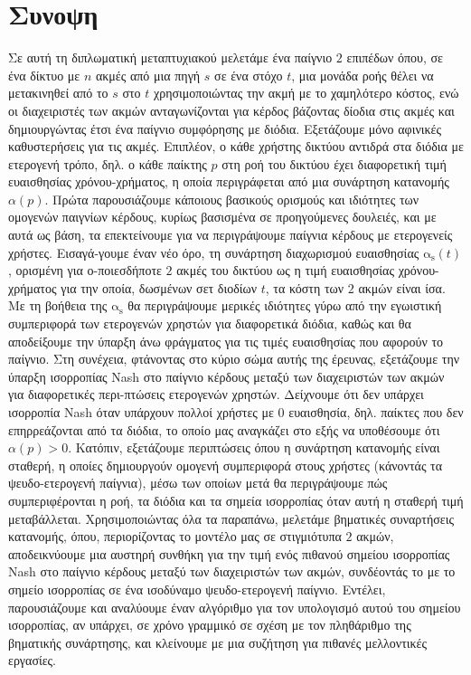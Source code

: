 \documentclass[10pt,a4paper]{book}
\newcommand{\as}{\mathrm{\alpha_s}}
\theoremstyle{definition}
\theoremstyle{comment}
\begin{document}
\thispagestyle{empty}
\null
\clearpage

\thispagestyle{empty}

\chapter*{Συνοψη}
Σε αυτή τη διπλωματική μεταπτυχιακού μελετάμε ένα παίγνιο $2$ επιπέδων όπου, σε ένα δίκτυο με $n$ ακμές από μια πηγή $s$ σε ένα στόχο $t$, μια μονάδα ροής θέλει να μετακινηθεί από το $s$ στο $t$ χρησιμοποιώντας την ακμή με το χαμηλότερο κόστος, ενώ οι διαχειριστές των ακμών ανταγωνίζονται για κέρδος βάζοντας δίοδια στις ακμές και δημιουργώντας έτσι ένα παίγνιο συμφόρησης με διόδια.
Εξετάζουμε μόνο αφινικές καθυστερήσεις για τις ακμές.
Επιπλέον, ο κάθε χρήστης δικτύου αντιδρά στα διόδια με ετερογενή τρόπο, δηλ. ο κάθε παίκτης $p$ στη ροή του δικτύου έχει διαφορετική τιμή ευαισθησίας χρόνου-χρήματος, η οποία περιγράφεται από μια συνάρτηση κατανομής $\alpha(p)$.
Πρώτα παρουσιάζουμε κάποιους βασικούς ορισμούς και ιδιότητες των ομογενών παιγνίων κέρδους, κυρίως βασισμένα σε προηγούμενες δουλειές, και με αυτά ως βάση, τα επεκτείνουμε για να περιγράψουμε παίγνια κέρδους με ετερογενείς χρήστες.
Εισαγά-γουμε έναν νέο όρο, τη συνάρτηση διαχωρισμού ευαισθησίας $\as(t)$, ορισμένη για ο-ποιεσδήποτε $2$ ακμές του δικτύου ως η τιμή ευαισθησίας χρόνου-χρήματος για την οποία, δωσμένων σετ διοδίων $t$, τα κόστη των $2$ ακμών είναι ίσα.
Με τη βοήθεια της $\as$ θα περιγράψουμε μερικές ιδιότητες γύρω από την εγωιστική συμπεριφορά των ετερογενών χρηστών για διαφορετικά διόδια, καθώς και θα αποδείξουμε την ύπαρξη άνω φράγματος για τις τιμές ευαισθησίας που αφορούν το παίγνιο.
Στη συνέχεια, φτάνοντας στο κύριο σώμα αυτής της έρευνας, εξετάζουμε την ύπαρξη ισορροπίας Nash στο παίγνιο κέρδους μεταξύ των διαχειριστών των ακμών για διαφορετικές περι-πτώσεις ετερογενών χρηστών.
Δείχνουμε ότι δεν υπάρχει ισορροπία Nash όταν υπάρχουν πολλοί χρήστες με $0$ ευαισθησία, δηλ. παίκτες που δεν επηρρεάζονται από τα διόδια, το οποίο μας αναγκάζει στο εξής να υποθέσουμε ότι $\alpha(p) > 0$.
Κατόπιν, εξετάζουμε περιπτώσεις όπου η συνάρτηση κατανομής είναι σταθερή, η οποίες δημιουργούν ομογενή συμπεριφορά στους χρήστες (κάνοντάς τα ψευδο-ετερογενή παίγνια), μέσω των οποίων μετά θα περιγράψουμε πώς συμπεριφέρονται η ροή, τα διόδια και τα σημεία ισορροπίας όταν αυτή η σταθερή τιμή μεταβάλλεται.
Χρησιμοποιώντας όλα τα παραπάνω, μελετάμε βηματικές συναρτήσεις κατανομής, όπου, περιορίζοντας το μοντέλο μας σε στιγμιότυπα $2$ ακμών, αποδεικνύουμε μια αυστηρή συνθήκη για την τιμή ενός πιθανού σημείου ισορροπίας Nash στο παίγνιο κέρδους μεταξύ των διαχειριστών των ακμών, συνδέοντάς το με το σημείο ισορροπίας σε ένα ισοδύναμο ψευδο-ετερογενή παίγνιο.
Εντέλει, παρουσιάζουμε και αναλύουμε έναν αλγόριθμο για τον υπολογισμό αυτού του σημείου ισορροπίας, αν υπάρχει, σε χρόνο γραμμικό σε σχέση με τον πληθάριθμο της βηματικής συνάρτησης, και κλείνουμε με μια συζήτηση για πιθανές μελλοντικές εργασίες.
\end{document}
